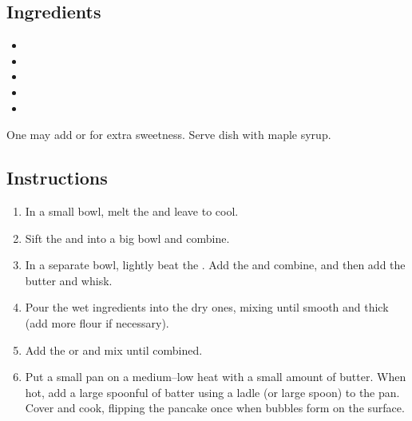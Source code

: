 \documentclass[12pt]{article}
\begin{document}
\recipetitle

\subsection*{Ingredients}

\begin{itemize}[nolistsep]
    \item {}
    \item {}
    \item {}
    \item {}
    \item {}
\end{itemize}

One may add  or  for extra sweetness. Serve dish with maple syrup.

\subsection*{Instructions}

\begin{enumerate}
    \item In a small bowl, melt the  and leave to cool.
    \item Sift the  and  into a big bowl and combine.
    \item In a separate bowl, lightly beat the . Add the  and combine, and then add the butter and whisk.
    \item Pour the wet ingredients into the dry ones, mixing until smooth and thick (add more flour if necessary).
    \item Add the  or  and mix until combined.
    \item Put a small pan on a medium--low heat with a small amount of butter. When hot, add a large spoonful of batter using a ladle (or large spoon) to the pan. Cover and cook, flipping the pancake once when bubbles form on the surface.
\end{enumerate}
\end{document}
